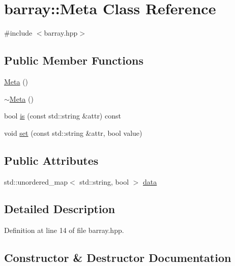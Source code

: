 \hypertarget{classbarray_1_1_meta}{}\section{barray\+:\+:Meta Class Reference}
\label{classbarray_1_1_meta}


{\ttfamily \#include $<$barray.\+hpp$>$}

\subsection*{Public Member Functions}
\begin{DoxyCompactItemize}
\item 
\hyperlink{classbarray_1_1_meta_ad9f6684eabd87248fbce8cbf922b5a9e}{Meta} ()
\item 
\hyperlink{classbarray_1_1_meta_a3473189e85a77777860000c3ebd466e3}{$\sim$\+Meta} ()
\item 
bool \hyperlink{classbarray_1_1_meta_a935668f7ea11c899be35505093a15415}{is} (const std\+::string \&attr) const
\item 
void \hyperlink{classbarray_1_1_meta_a988be331a6084a39edafbeb7c5553ca5}{set} (const std\+::string \&attr, bool value)
\end{DoxyCompactItemize}
\subsection*{Public Attributes}
\begin{DoxyCompactItemize}
\item 
std\+::unordered\+\_\+map$<$ std\+::string, bool $>$ \hyperlink{classbarray_1_1_meta_ab5bb9f81ec51907231fc5b89717e34e3}{data}
\end{DoxyCompactItemize}


\subsection{Detailed Description}


Definition at line 14 of file barray.\+hpp.



\subsection{Constructor \& Destructor Documentation}
\mbox{\label{classbarray_1_1_meta_ad9f6684eabd87248fbce8cbf922b5a9e}} 

